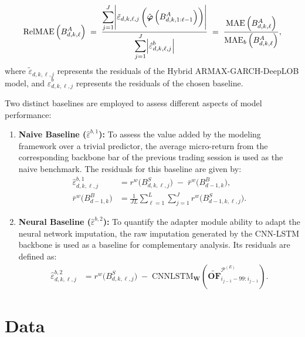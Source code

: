 \documentclass{rQUF2e}
\theoremstyle{plain}
\theoremstyle{definition}
\theoremstyle{remark}
\DeclarePairedDelimiter{\aval}{\lvert}{\rvert} %
\begin{document}
\[
    \mathrm{RelMAE}\left( B^A_{d, k, \ell} \right)
    \;=\;
    \frac{\displaystyle\sum_{j=1}^{J} \aval*{\tilde{\varepsilon}_{d, k, \ell, j}\left( \hat{\boldsymbol{\varphi}} \left( B^A_{d,k,1:\ell - 1} \right) \right)}}{\displaystyle\sum_{j=1}^{J} \aval*{\hat{\varepsilon}^b_{d, k, \ell, j}}}
    \;=\;
    \frac{\mathrm{MAE}\left( B^A_{d, k, \ell} \right)}{\mathrm{MAE}_{b}\left( B^A_{d, k, \ell} \right)},
\]
where $\tilde{\varepsilon}_{d, k, \ell, j}$ represents the residuals of the Hybrid ARMAX-GARCH-DeepLOB model, and $\hat{\varepsilon}^b_{d, k, \ell, j}$ represents the residuals of the chosen baseline.

Two distinct baselines are employed to assess different aspects of model performance:

\begin{enumerate}
    \item \textbf{Naive Baseline ($\hat{\varepsilon}^{b,1}$):} To assess the value added by the modeling framework over a trivial predictor, the average micro-return from the corresponding backbone bar of the previous trading session is used as the naive benchmark. The residuals for this baseline are given by:
          \begin{align*}
              \hat{\varepsilon}^{b, 1}_{d,k,\ell,j} & = r^w\bigl(B^S_{d,k,\ell,j}\bigr) \;-\; \bar{r}^w\bigl(B^B_{d - 1, k}\bigr),         \\
              \bar{r}^w\bigl(B^B_{d - 1, k}\bigr)   & = \frac{1}{JL} \sum_{\ell = 1}^L \sum_{j = 1}^J r^w\bigl(B^S_{d - 1,k,\ell,j}\bigr).
          \end{align*}

    \item \textbf{Neural Baseline ($\hat{\varepsilon}^{b,2}$):} To quantify the adapter module ability to adapt the neural network imputation, the raw imputation generated by the CNN-LSTM backbone is used as a baseline for complementary analysis. Its residuals are defined as:
          \begin{align*}
              \hat{\varepsilon}^{b, 2}_{d,k,\ell,j} & = r^w\bigl(B^S_{d,k,\ell,j}\bigr) \;-\; \mathrm{CNNLSTM}_{\mathbf{W}}\!\left(\widetilde{\mathbf{OF}}^{\mathcal{P}^{(E)}}_{i_{j-1}-99:i_{j-1}}\right).
          \end{align*}
\end{enumerate}


\section{Data}
\label{sec:data}
\end{document}
